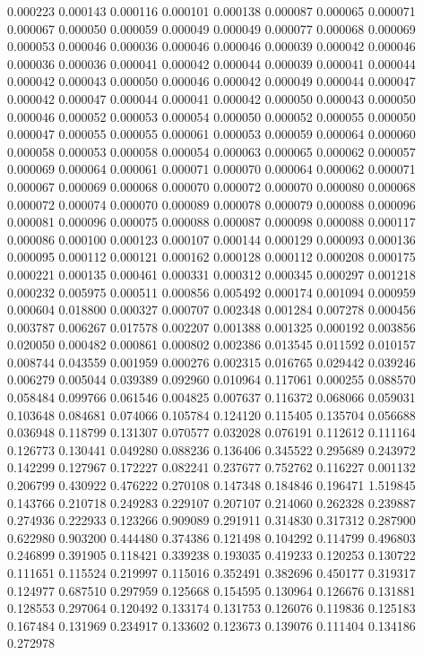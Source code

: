 0.000223
0.000143
0.000116
0.000101
0.000138
0.000087
0.000065
0.000071
0.000067
0.000050
0.000059
0.000049
0.000049
0.000077
0.000068
0.000069
0.000053
0.000046
0.000036
0.000046
0.000046
0.000039
0.000042
0.000046
0.000036
0.000036
0.000041
0.000042
0.000044
0.000039
0.000041
0.000044
0.000042
0.000043
0.000050
0.000046
0.000042
0.000049
0.000044
0.000047
0.000042
0.000047
0.000044
0.000041
0.000042
0.000050
0.000043
0.000050
0.000046
0.000052
0.000053
0.000054
0.000050
0.000052
0.000055
0.000050
0.000047
0.000055
0.000055
0.000061
0.000053
0.000059
0.000064
0.000060
0.000058
0.000053
0.000058
0.000054
0.000063
0.000065
0.000062
0.000057
0.000069
0.000064
0.000061
0.000071
0.000070
0.000064
0.000062
0.000071
0.000067
0.000069
0.000068
0.000070
0.000072
0.000070
0.000080
0.000068
0.000072
0.000074
0.000070
0.000089
0.000078
0.000079
0.000088
0.000096
0.000081
0.000096
0.000075
0.000088
0.000087
0.000098
0.000088
0.000117
0.000086
0.000100
0.000123
0.000107
0.000144
0.000129
0.000093
0.000136
0.000095
0.000112
0.000121
0.000162
0.000128
0.000112
0.000208
0.000175
0.000221
0.000135
0.000461
0.000331
0.000312
0.000345
0.000297
0.001218
0.000232
0.005975
0.000511
0.000856
0.005492
0.000174
0.001094
0.000959
0.000604
0.018800
0.000327
0.000707
0.002348
0.001284
0.007278
0.000456
0.003787
0.006267
0.017578
0.002207
0.001388
0.001325
0.000192
0.003856
0.020050
0.000482
0.000861
0.000802
0.002386
0.013545
0.011592
0.010157
0.008744
0.043559
0.001959
0.000276
0.002315
0.016765
0.029442
0.039246
0.006279
0.005044
0.039389
0.092960
0.010964
0.117061
0.000255
0.088570
0.058484
0.099766
0.061546
0.004825
0.007637
0.116372
0.068066
0.059031
0.103648
0.084681
0.074066
0.105784
0.124120
0.115405
0.135704
0.056688
0.036948
0.118799
0.131307
0.070577
0.032028
0.076191
0.112612
0.111164
0.126773
0.130441
0.049280
0.088236
0.136406
0.345522
0.295689
0.243972
0.142299
0.127967
0.172227
0.082241
0.237677
0.752762
0.116227
0.001132
0.206799
0.430922
0.476222
0.270108
0.147348
0.184846
0.196471
1.519845
0.143766
0.210718
0.249283
0.229107
0.207107
0.214060
0.262328
0.239887
0.274936
0.222933
0.123266
0.909089
0.291911
0.314830
0.317312
0.287900
0.622980
0.903200
0.444480
0.374386
0.121498
0.104292
0.114799
0.496803
0.246899
0.391905
0.118421
0.339238
0.193035
0.419233
0.120253
0.130722
0.111651
0.115524
0.219997
0.115016
0.352491
0.382696
0.450177
0.319317
0.124977
0.687510
0.297959
0.125668
0.154595
0.130964
0.126676
0.131881
0.128553
0.297064
0.120492
0.133174
0.131753
0.126076
0.119836
0.125183
0.167484
0.131969
0.234917
0.133602
0.123673
0.139076
0.111404
0.134186
0.272978
